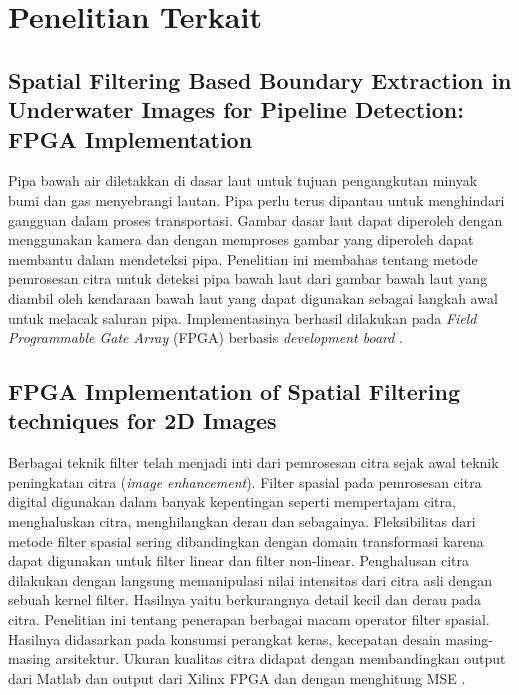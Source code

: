 


\section{Penelitian Terkait}
\subsection{Spatial Filtering Based Boundary Extraction in Underwater Images for Pipeline Detection: FPGA Implementation}
Pipa bawah air diletakkan di dasar laut untuk tujuan pengangkutan minyak bumi dan gas menyebrangi lautan. Pipa perlu terus dipantau untuk menghindari gangguan dalam proses transportasi. Gambar dasar laut dapat diperoleh dengan menggunakan kamera dan dengan memproses gambar yang diperoleh dapat membantu dalam mendeteksi pipa. Penelitian ini membahas tentang metode pemrosesan citra untuk deteksi pipa bawah laut dari gambar bawah laut yang diambil oleh kendaraan bawah laut yang dapat digunakan sebagai langkah awal untuk melacak saluran pipa. Implementasinya berhasil dilakukan pada \textit{Field Programmable Gate Array} (FPGA) berbasis \textit{development board} \cite{soa:alex-raj}.

\subsection{FPGA Implementation of Spatial Filtering techniques for 2D Images}
Berbagai teknik filter telah menjadi inti dari pemrosesan citra sejak awal teknik peningkatan citra (\textit{image enhancement}). Filter spasial pada pemrosesan citra digital digunakan dalam banyak kepentingan seperti mempertajam citra, menghaluskan citra, menghilangkan derau dan sebagainya. Fleksibilitas dari metode filter spasial sering dibandingkan dengan domain transformasi karena dapat digunakan untuk filter linear dan filter non-linear. Penghalusan citra dilakukan dengan langsung memanipulasi nilai intensitas dari citra asli dengan sebuah kernel filter. Hasilnya yaitu berkurangnya detail kecil dan derau pada citra. Penelitian ini tentang penerapan berbagai macam operator filter spasial. Hasilnya didasarkan pada konsumsi perangkat keras, kecepatan desain masing-masing arsitektur. Ukuran kualitas citra didapat dengan membandingkan output dari Matlab dan output dari Xilinx FPGA dan dengan menghitung MSE \cite{soa:sushant}.

